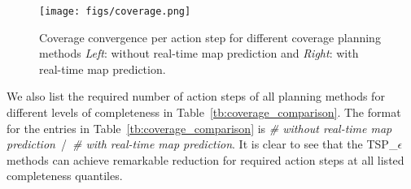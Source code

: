 \begin{figure}[t] 
  \centering
  	{\label{fig:coverage}\texttt{[image: figs/coverage.png]}}
  \caption{\small Coverage convergence per action step for different coverage planning methods \textit{Left}: without real-time map prediction and \textit{Right}: with real-time map prediction.
  } \vspace{-10pt}
\label{fig:coverage}  
\end{figure}

We also list the required number of action steps of all planning methods for different levels of completeness in Table~\ref{tb:coverage_comparison}. The format for the entries in Table~\ref{tb:coverage_comparison} is \textit{\# without real-time map prediction}~/~\textit{\# with real-time map prediction}. It is clear to see that the TSP\_$\epsilon$ methods can achieve remarkable reduction for required action steps at all listed completeness quantiles.








